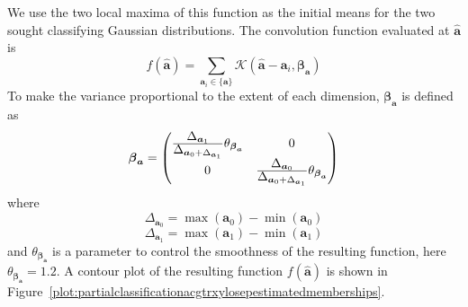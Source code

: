 We use the two local maxima of this function as the initial means for the two
sought classifying Gaussian distributions. The convolution function evaluated
at $\boldsymbol{\hat{a}}$ is
\[
    f(\boldsymbol{\hat{a}}) = \sum_{\boldsymbol{a}_i \in \{\boldsymbol{a}\}}
    \mathscr{K} \left( \boldsymbol{\hat{a}} - \boldsymbol{a}_i,
    \boldsymbol{\beta}_{\boldsymbol{a}} \right)
\]
To make the variance proportional to the extent of each dimension,
$\boldsymbol{\beta}_{\boldsymbol{a}}$ is defined as
\[
    \boldsymbol{\beta}_{\boldsymbol{a}}
    =
    \begin{pmatrix}
        \frac{\displaystyle\Delta_{\boldsymbol{a}_1}}{\displaystyle\Delta_{\boldsymbol{a}_0
        +\Delta_{\boldsymbol{a}_1}}}
            \theta_{\boldsymbol{\beta}_{\boldsymbol{a}}}
        & 0 \\
        0 & \frac{\displaystyle\Delta_{\boldsymbol{a}_0}}{\displaystyle\Delta_{\boldsymbol{a}_0
    +\Delta_{\boldsymbol{a}_1}}}
            \theta_{\boldsymbol{\beta}_{\boldsymbol{a}}}
    \end{pmatrix}
\]
where
\[
    \Delta_{\boldsymbol{a}_0} = \max \left( \boldsymbol{a}_0 \right)
        - \min \left( \boldsymbol{a}_0 \right)
\]
\[
    \Delta_{\boldsymbol{a}_1} = \max \left( \boldsymbol{a}_1 \right)
        - \min \left( \boldsymbol{a}_1 \right)
\]
and $\theta_{\boldsymbol{\beta}_{\boldsymbol{a}}}$ is a parameter to control
the smoothness of the resulting function, here
$\theta_{\boldsymbol{\beta}_{\boldsymbol{a}}} = 1.2$. A contour plot of the
resulting function $f(\boldsymbol{\hat{a}})$ is shown in
Figure~\ref{plot:partialclassificationacgtrxylosepestimatedmemberships}.


